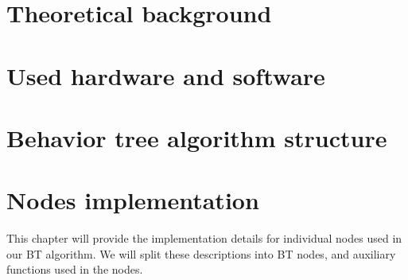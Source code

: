 \documentclass{ctuthesis}
\begin{document}
    \maketitle

    

    \chapter{Theoretical background}
        
        
        
        

    \chapter{Used hardware and software}
        
        
                

    \chapter{Behavior tree algorithm structure}

    \chapter{Nodes implementation}
        This chapter will provide the implementation details for individual nodes used in our BT algorithm. We will split these descriptions into BT nodes, and auxiliary functions used in the nodes.
        
        
        




    \printbibliography
\end{document}
